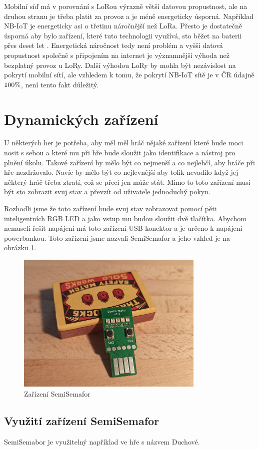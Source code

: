 Mobilní síď má v porovnání s LoRou výrazně větší datovou propustnost, ale na druhou stranu je třeba platit za provoz a je méně energeticky úsporná.
Například NB-IoT je energeticky asi o třetinu náročnější než LoRa.
Přesto je dostatečně úsporná aby bylo zařízení, které tuto technologii využívá, sto běžet na baterii přes deset let \cite{LoRaVSNB-IoT}.
Energetická náročnost tedy není problém a vyšší datová propustnost společně s připojením na internet je významnější výhoda než bezplatný provoz u LoRy.
Další výhodou LoRy by mohla být nezávislost na pokrytí mobilní sítí, ale vzhledem k tomu, že pokrytí NB-IoT sítě je v ČR údajně \(100\-\%\)\cite{NB-IoTPokryti}, není tento fakt důležitý. 

\newpage
\section{Dynamických zařízení}
U některých her je potřeba, aby měl měl hráč nějaké zařízení které bude moci nosit s sebou a které mu při hře bude sloužit jako identifikace a nástroj pro plnění úkolu.
Takové zařízení by mělo být co nejmenší a co nejlehčí, aby hráče při hře nezdržovalo.
Navíc by mělo být co nejlevnější aby tolik nevadilo když jej některý hráč třeba ztratí, což se přeci jen může stát.
Mimo to toto zařízení musí být sto zobrazit svuj stav a převzít od uživatele jednoduchý pokyn.

Rozhodli jsme že toto zařízení bude svuj stav zobrazovat pomocí pěti inteligentních RGB LED a jako vstup mu budou sloužit dvě tlačítka.
Abychom nemuseli řešit napájení má toto zařízení USB konektor a je určeno k napájení powerbankou.
Toto zařízení jsme nazvali SemiSemafor a jeho vzhled je na obrázku \ref{fig:SemiSemafor}.

\begin{figure}[h]
    \centering
    \includegraphics[width=0.8\textwidth]{text/TeoretickyUvod/AplikaceHernichZarizeni/img/1702085190411.jpg}
    \caption{Zařízení SemiSemafor}
    \label{fig:SemiSemafor}
\end{figure}

\subsection{Využití zařízení SemiSemafor}
SemiSemabor je využitelný například ve hře s názvem Duchové.

